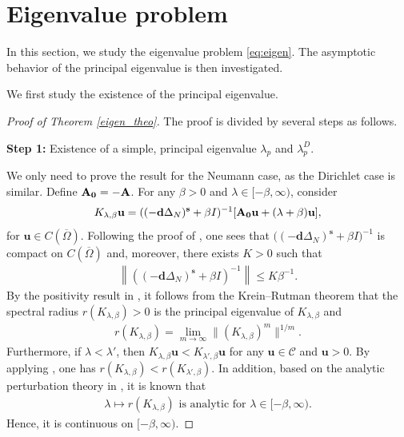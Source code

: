 \documentclass[a4paper,11pt]{amsart}
\theoremstyle{definition}
\def\O{\Omega}
\numberwithin{equation}{section}
\theoremstyle{definition}
\def\O{\Omega}
\begin{document}
\section{\bf Eigenvalue problem}\label{Section 2.2}

In this section, we study the eigenvalue problem \eqref{eq:eigen}. The asymptotic behavior of the principal eigenvalue is then investigated.

We first study the existence of the principal eigenvalue.


\begin{proof}[Proof of Theorem \ref{eigen_theo}]

The proof is divided by several steps as follows.

{\bf Step 1:} Existence of a simple, principal eigenvalue $\lambda_p$ and $\lambda_p^D$.

We only need to prove the result for the Neumann case, as the Dirichlet case is similar. Define ${\bf A_0}=-{\bf A}$. For any $\beta>0$ and $\lambda \in [-\beta,\infty)$, consider
\begin{align*}
K_{\lambda,\beta}\textbf{u}=((-\textbf{d}\Delta_N)^{\textbf{s}}+\beta I)^{-1}[{\bf A_0u}+(\lambda+\beta)\textbf{u}],
\end{align*}
for $\textbf{u}\in C(\overline{\O})$. Following the proof of \cite[Theorem 3.1, Steps 1–2]{zhao_spatiotemporal_2025}, one sees that $\big((-\mathbf{d}\Delta_N)^{\mathbf{s}}+\beta I\big)^{-1}$ is compact on $C(\overline{\Omega})$ and, moreover, there exists $K > 0$ such that
\begin{align*}
\left\|((-\textbf{d}\Delta_N)^{\textbf{s}}+\beta I)^{-1}\right\|\leq K \beta^{-1}.
\end{align*}
By the positivity result in \cite[Theorem 3.1, Step~3]{zhao_spatiotemporal_2025}, it follows from the Krein–Rutman theorem that the spectral radius $r(K_{\lambda,\beta}) > 0$ is the principal eigenvalue of $K_{\lambda,\beta}$ and
\begin{align*}
r(K_{\lambda,\beta})=\lim_{m\rightarrow \infty}\|(K_{\lambda,\beta})^m\|^{1/m}.
\end{align*}
Furthermore, if $\lambda<\lambda'$, then $K_{\lambda,\beta}\textbf{u}<K_{\lambda',\beta}\textbf{u}$ for any $\textbf{u}\in \mathcal{C}$ and $\mathbf{u}>0$. By applying \cite[Theorem 3.2(v)]{amann_fixed_1976}, one has $r(K_{\lambda,\beta})<r(K_{\lambda',\beta})$. In addition, based on the analytic perturbation theory in \cite[Chapter 7, Theorem 1.8]{kato_1976}, it is known that
\begin{align*}
\lambda \mapsto r(K_{\lambda,\beta}) \text{ is analytic for } \lambda \in [-\beta,\infty).
\end{align*}
Hence, it is continuous on $[-\beta,\infty)$. 


\end{proof}
\end{document}
